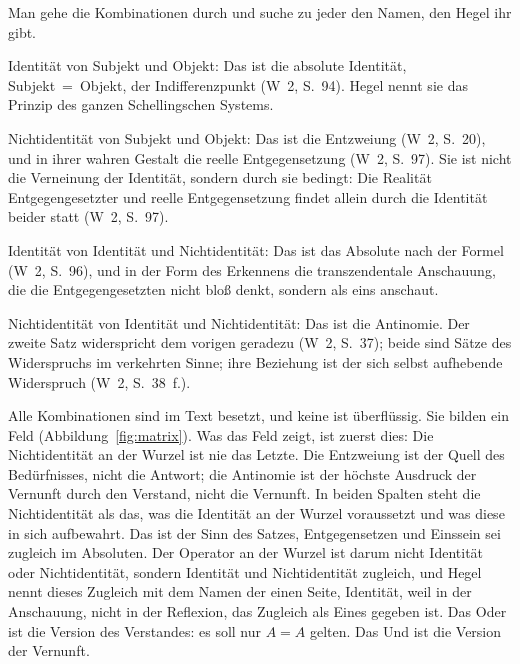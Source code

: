 \documentclass[11pt,a4paper]{article}
\newcommand{\Werke}[1]{(W~2, S.~#1)}
\begin{document}
Man gehe die Kombinationen durch und suche zu jeder den Namen, den Hegel ihr gibt.

Identität von Subjekt und Objekt: Das ist die absolute Identität, Subjekt~=~Objekt, der Indifferenzpunkt \Werke{94}. Hegel nennt sie das Prinzip des ganzen Schellingschen Systems.

Nichtidentität von Subjekt und Objekt: Das ist die Entzweiung \Werke{20}, und in ihrer wahren Gestalt die reelle Entgegensetzung \Werke{97}. Sie ist nicht die Verneinung der Identität, sondern durch sie bedingt: \glqq Die Realität Entgegengesetzter und reelle Entgegensetzung findet allein durch die Identität beider statt\grqq{} \Werke{97}.

Identität von Identität und Nichtidentität: Das ist das Absolute nach der Formel \Werke{96}, und in der Form des Erkennens die transzendentale Anschauung, die die Entgegengesetzten nicht bloß denkt, sondern als eins anschaut.

Nichtidentität von Identität und Nichtidentität: Das ist die Antinomie. Der zweite Satz \glqq widerspricht dem vorigen geradezu\grqq{} \Werke{37}; beide sind Sätze des Widerspruchs im verkehrten Sinne; ihre Beziehung ist der sich selbst aufhebende Widerspruch \Werke{38~f.}.

Alle Kombinationen sind im Text besetzt, und keine ist überflüssig. Sie bilden ein Feld (Abbildung~\ref{fig:matrix}). Was das Feld zeigt, ist zuerst dies: Die Nichtidentität an der Wurzel ist nie das Letzte. Die Entzweiung ist der Quell des Bedürfnisses, nicht die Antwort; die Antinomie ist der höchste Ausdruck der Vernunft durch den Verstand, nicht die Vernunft. In beiden Spalten steht die Nichtidentität als das, was die Identität an der Wurzel voraussetzt und was diese in sich aufbewahrt. Das ist der Sinn des Satzes, Entgegensetzen und Einssein sei zugleich im Absoluten. Der Operator an der Wurzel ist darum nicht Identität oder Nichtidentität, sondern Identität und Nichtidentität zugleich, und Hegel nennt dieses Zugleich mit dem Namen der einen Seite, Identität, weil in der Anschauung, nicht in der Reflexion, das Zugleich als Eines gegeben ist. Das Oder ist die Version des Verstandes: \glqq es soll nur $A = A$ gelten\grqq{}. Das Und ist die Version der Vernunft.
\end{document}

